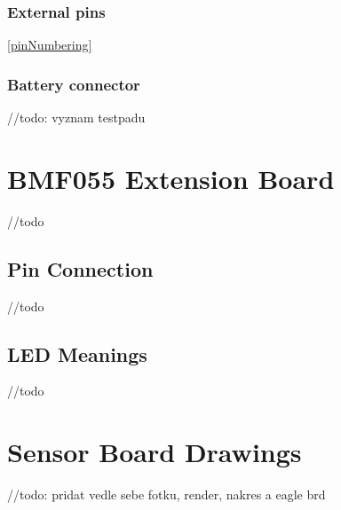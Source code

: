 \subsubsection{External pins} \ref{pinNumbering}
\subsubsection{Battery connector}

//todo: vyznam testpadu

\section{BMF055 Extension Board}
//todo

\subsection{Pin Connection}
//todo

\subsection{LED Meanings}
//todo



\section{Sensor Board Drawings}
//todo: pridat vedle sebe fotku, render, nakres a eagle brd
